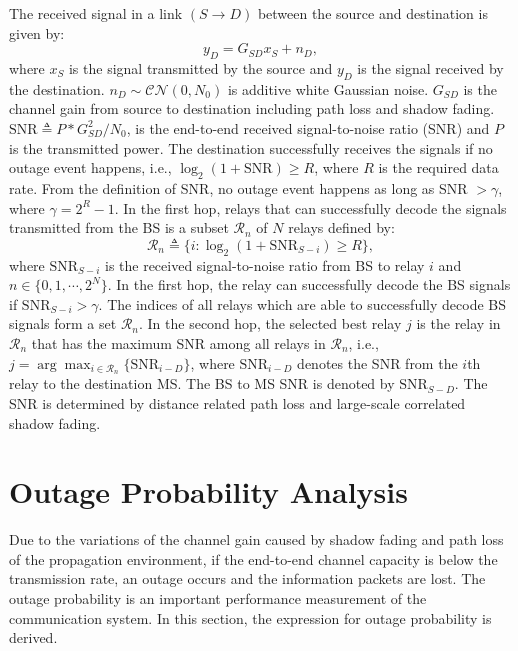 \par The received signal in a link $(S\to D)$ between the source and destination is given by:
\begin{equation}
y_{D} = G_{SD}x_{S}+n_{D},
\end{equation}
where $x_{S}$ is the signal transmitted by the source and $y_{D}$ is the signal received by the destination. $n_{D}\sim \mathcal{CN}(0,N_{0})$ is additive white Gaussian noise. $G_{SD}$ is the channel gain from source to destination including path loss and shadow fading. $\text{SNR} \triangleq P*G_{SD}^{2}/N_{0}$, is the end-to-end received signal-to-noise ratio (SNR) and $P$ is the transmitted power. The destination successfully receives the signals if no outage event happens, i.e., $\log_{2}(1+\text{SNR})\ge R$, where $R$ is the required data rate. From the definition of SNR, no outage event happens as long as SNR $> \gamma$, where $\gamma = 2^{R}-1$.
In the first hop, relays that can successfully decode the signals transmitted from the BS is a subset $\mathcal{R}_{n}$ of $N$ relays defined by:
\begin{equation}
\mathcal{R}_{n}\triangleq \{ i: \log_{2}(1+\text{SNR}_{S-i})\ge R\},
\end{equation}
where $\text{SNR}_{S-i}$ is the received signal-to-noise ratio from BS to relay $i$ and $n\in\{0,1,\cdots,2^{N}\}$.
In the first hop, the relay can successfully decode the BS signals if $\text{SNR}_{S-i}>\gamma$. The indices of all relays which are able to successfully decode BS signals form a set $\mathcal{R}_{n}$. In the second hop, the selected best relay $j$ is the relay in $\mathcal{R}_{n}$ that has the maximum SNR among all relays in $\mathcal{R}_{n}$, i.e., $j=\arg\max_{i\in \mathcal{R}_{n}}\{\text{SNR}_{i-D}\}$, where $\text{SNR}_{i-D}$ denotes the SNR from the $i$th relay to the destination MS. The BS to MS SNR is denoted by $\text{SNR}_{S-D}$. The SNR is determined by distance related path loss and large-scale correlated shadow fading.

\section{Outage Probability Analysis}
\label{sec:AA}
Due to the variations of the channel gain caused by shadow fading and path loss of the propagation environment, if the  end-to-end  channel capacity is below the transmission rate, an outage occurs and the information packets are lost. The outage probability is an important performance measurement of the communication system. In this section, the expression for outage probability is derived.

